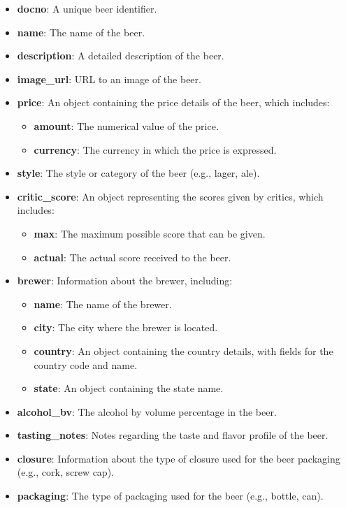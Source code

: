 \begin{itemize}
  \item \textbf{docno}: A unique beer identifier.
  \item \textbf{name}: The name of the beer.
  \item \textbf{description}: A detailed description of the beer.
  \item \textbf{image\_url}: URL to an image of the beer.
  \item \textbf{price}: An object containing the price details of the beer, which includes:
        \begin{itemize}
          \item \textbf{amount}: The numerical value of the price.
          \item \textbf{currency}: The currency in which the price is expressed.
        \end{itemize}
  \item \textbf{style}: The style or category of the beer (e.g., lager, ale).
  \item \textbf{critic\_score}: An object representing the scores given by critics, which includes:
        \begin{itemize}
          \item \textbf{max}: The maximum possible score that can be given.
          \item \textbf{actual}: The actual score received to the beer.
        \end{itemize}
  \item \textbf{brewer}: Information about the brewer, including:
        \begin{itemize}
          \item \textbf{name}: The name of the brewer.
          \item \textbf{city}: The city where the brewer is located.
          \item \textbf{country}: An object containing the country details, with fields for the country code and name.
          \item \textbf{state}: An object containing the state name.
        \end{itemize}
  \item \textbf{alcohol\_bv}: The alcohol by volume percentage in the beer.
  \item \textbf{tasting\_notes}: Notes regarding the taste and flavor profile of the beer.
  \item \textbf{closure}: Information about the type of closure used for the beer packaging (e.g., cork, screw cap).
  \item \textbf{packaging}: The type of packaging used for the beer (e.g., bottle, can).
\end{itemize}

